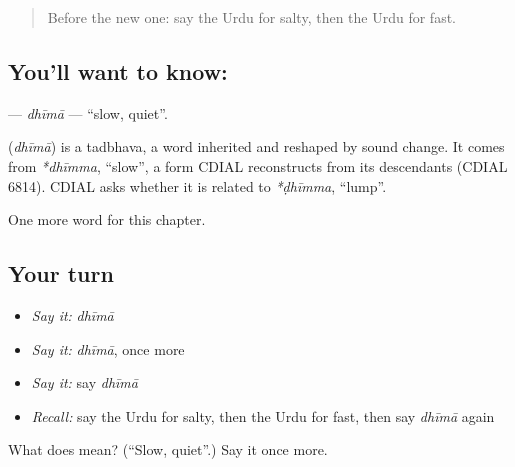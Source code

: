\label{lesson:UR-C131-dhima}



\begin{quote}
Before the new one: say the Urdu for salty, then the Urdu for fast.
\end{quote}

\subsection*{You'll want to know: }
\textbf{} — \emph{dhīmā} — \textquotedblleft{}slow, quiet\textquotedblright{}.

\begin{cousinweb}
\textbf{} (\emph{dhīmā}) is a tadbhava, a word inherited and reshaped by sound change. It comes from \emph{*dhīmma}, \textquotedblleft{}slow\textquotedblright{}, a form CDIAL reconstructs from its descendants (CDIAL 6814). CDIAL asks whether it is related to \emph{*ḍhīmma}, \textquotedblleft{}lump\textquotedblright{}.
\end{cousinweb}

\begin{grammarlens}[title={What you've built}]
One more word for this chapter.
\end{grammarlens}

\subsection*{Your turn}
\begin{itemize}
\raggedright
  \item \emph{Say it:} \emph{dhīmā}
  \item \emph{Say it:} \emph{dhīmā}, once more
  \item \emph{Say it:} say \emph{dhīmā}
  \item \emph{Recall:} say the Urdu for salty, then the Urdu for fast, then say \emph{dhīmā} again
\end{itemize}

\begin{tcolorbox}[breakable,colback=teal!4,colframe=teal!35!black,title={Before you move on}]
What does  mean? (\textquotedblleft{}Slow, quiet\textquotedblright{}.) Say it once more.
\end{tcolorbox}
